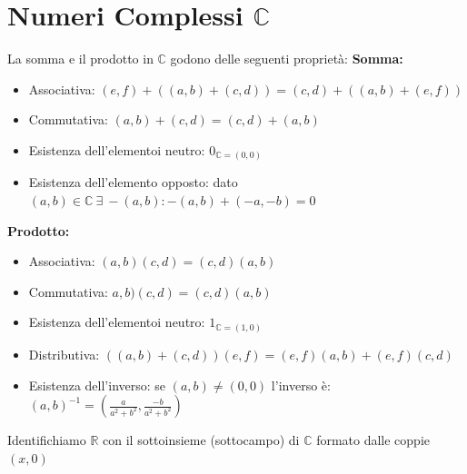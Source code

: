 \documentclass{report}
\begin{document}
\section{Numeri Complessi $\mathbb{C}$}
La somma e il prodotto in $\mathbb{C}$ godono delle seguenti proprietà:
\textbf{Somma:}
\begin{itemize}
    \item{Associativa: $(e,f) + ((a,b) + (c,d)) = (c,d) + ((a,b) + (e,f))$}
    \item{Commutativa: $(a,b) + (c,d) = (c,d) + (a,b)$}
    \item{Esistenza dell'elementoi neutro: $0_{\mathbb{C} = (0,0)}$}
    \item{Esistenza dell'elemento opposto: dato $(a,b) \in \mathbb{C} \ \exists \ -(a,b) : -(a,b) + (-a, -b) = 0$}
\end{itemize}
\textbf{Prodotto:}
\begin{itemize}
    \item{Associativa: $(a,b)(c,d) = (c,d)(a,b)$}
    \item{Commutativa: $a,b)(c,d) = (c,d)(a,b)$}
    \item{Esistenza dell'elementoi neutro: $1_{\mathbb{C} = (1,0)}$}
    \item{Distributiva: $((a,b) + (c,d))(e,f) = (e,f)(a,b) + (e,f)(c,d)$}
    \item{Esistenza dell'inverso: se $(a,b) \neq (0,0)$ l'inverso è: $(a,b)^{-1} = (\frac{a}{a^2 + b^2}, \frac{-b}{a^2 + b^2})$}
\end{itemize}
Identifichiamo $\mathbb{R}$ con il sottoinsieme (sottocampo) di $\mathbb{C}$ formato dalle coppie $(x, 0)$ 
\end{document}
